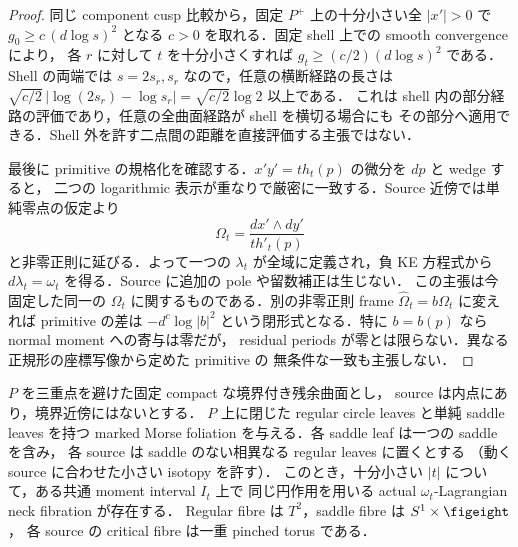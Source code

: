 \begin{proof}
同じ component cusp 比較から，固定 $P^+$ 上の十分小さい全 $|x'|>0$ で
$g_0\ge c\,(d\log s)^2$ となる $c>0$ を取れる．固定 shell 上での smooth convergence により，
各 $r$ に対して $t$ を十分小さくすれば $g_t\ge(c/2)(d\log s)^2$ である．
Shell の両端では $s=2s_r,s_r$ なので，任意の横断経路の長さは
$\sqrt{c/2}\,|\log(2s_r)-\log s_r|=\sqrt{c/2}\log2$ 以上である．
これは shell 内の部分経路の評価であり，任意の全曲面経路が shell を横切る場合にも
その部分へ適用できる．Shell 外を許す二点間の距離を直接評価する主張ではない．

最後に primitive の規格化を確認する．$x'y'=t h_t(p)$ の微分を $dp$ と wedge すると，
二つの logarithmic 表示が重なりで厳密に一致する．Source 近傍では単純零点の仮定より
\[
 \Omega_t=\frac{dx'\wedge dy'}{t h'_t(p)}
\]
と非零正則に延びる．よって一つの $\lambda_t$ が全域に定義され，負 KE 方程式から
$d\lambda_t=\omega_t$ を得る．Source に追加の pole や留数補正は生じない．
この主張は今固定した同一の $\Omega_t$ に関するものである．別の非零正則 frame
$\widehat\Omega_t=b\Omega_t$ に変えれば primitive の差は
$-d^c\log|b|^2$ という閉形式となる．特に $b=b(p)$ なら normal moment への寄与は零だが，
residual periods が零とは限らない．異なる正規形の座標写像から定めた primitive の
無条件な一致も主張しない．
\end{proof}

\begin{theorem}
\label{ke:projected-source-neck}
$P$ を三重点を避けた固定 compact な境界付き残余曲面とし，
source は内点にあり，境界近傍にはないとする．
$P$ 上に閉じた regular circle leaves と単純 saddle leaves を持つ
marked Morse foliation を与える．各 saddle leaf は一つの saddle を含み，
各 source は saddle のない相異なる regular leaves に置くとする
（動く source に合わせた小さい isotopy を許す）．
このとき，十分小さい $|t|$ について，ある共通 moment interval $I_t$ 上で
同じ円作用を用いる actual $\omega_t$-Lagrangian neck fibration が存在する．
Regular fibre は $T^2$，saddle fibre は $S^1\times\figeight$，
各 source の critical fibre は一重 pinched torus である．
\end{theorem}

